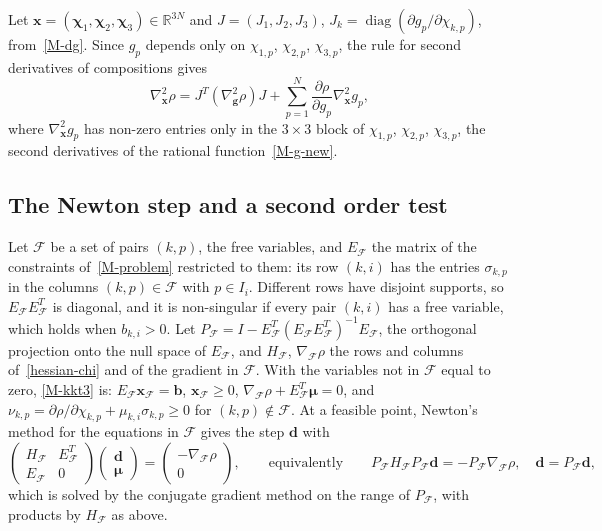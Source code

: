 Let $\bm x=(\bm\chi_1,\bm\chi_2,\bm\chi_3)\in\mathbb{R}^{3N}$ and
$J=\left(J_1,J_2,J_3\right)$, $J_k=\operatorname{diag}\left(\partial g_p/\partial\chi_{k,p}\right)$,
from~\eqref{M-dg}. Since $g_p$ depends only on $\chi_{1,p}$, $\chi_{2,p}$,
$\chi_{3,p}$, the rule for second derivatives of compositions gives
\begin{equation}\label{hessian-chi}
\nabla^2_{\bm x}\rho=J^T\left(\nabla^2_{\bm g}\rho\right)J+\sum_{p=1}^N\frac{\partial\rho}{\partial g_p}\nabla^2_{\bm x}g_p,
\end{equation}
where $\nabla^2_{\bm x}g_p$ has non-zero entries only in the $3\times3$ block
of $\chi_{1,p}$, $\chi_{2,p}$, $\chi_{3,p}$, the second derivatives of the
rational function~\eqref{M-g-new}.

\subsection{The Newton step and a second order test}\label{app-newton}

Let $\mathcal{F}$ be a set of pairs $(k,p)$, the free variables, and
$E_{\mathcal F}$ the matrix of the constraints of~\eqref{M-problem} restricted
to them: its row $(k,i)$ has the entries $\sigma_{k,p}$ in the columns
$(k,p)\in\mathcal F$ with $p\in I_i$. Different rows have disjoint supports,
so $E_{\mathcal F}E_{\mathcal F}^T$ is diagonal, and it is non-singular if every
pair $(k,i)$ has a free variable, which holds when $b_{k,i}>0$. Let
$P_{\mathcal F}=I-E_{\mathcal F}^T\left(E_{\mathcal F}E_{\mathcal F}^T\right)^{-1}E_{\mathcal F}$,
the orthogonal projection onto the null space of $E_{\mathcal F}$, and
$H_{\mathcal F}$, $\nabla_{\mathcal F}\rho$ the rows and columns of~\eqref{hessian-chi}
and of the gradient in $\mathcal F$. With the variables not in $\mathcal F$
equal to zero, \eqref{M-kkt3} is: $E_{\mathcal F}\bm x_{\mathcal F}=\bm b$,
$\bm x_{\mathcal F}\ge 0$,
$\nabla_{\mathcal F}\rho+E_{\mathcal F}^T\bm\mu=0$, and
$\nu_{k,p}=\partial\rho/\partial\chi_{k,p}+\mu_{k,i}\sigma_{k,p}\ge 0$ for
$(k,p)\notin\mathcal F$. At a feasible point, Newton's method for the
equations in $\mathcal F$ gives the step $\bm d$ with
\begin{equation}\label{newton-step}
\begin{pmatrix}H_{\mathcal F}&E_{\mathcal F}^T\\ E_{\mathcal F}&0\end{pmatrix}
\begin{pmatrix}\bm d\\ \bm\mu\end{pmatrix}
=\begin{pmatrix}-\nabla_{\mathcal F}\rho\\ 0\end{pmatrix},
\qquad\mbox{equivalently}\qquad
P_{\mathcal F}H_{\mathcal F}P_{\mathcal F}\bm d=-P_{\mathcal F}\nabla_{\mathcal F}\rho,\quad
\bm d=P_{\mathcal F}\bm d,
\end{equation}
which is solved by the conjugate gradient method on the range of
$P_{\mathcal F}$, with products by $H_{\mathcal F}$ as above.


